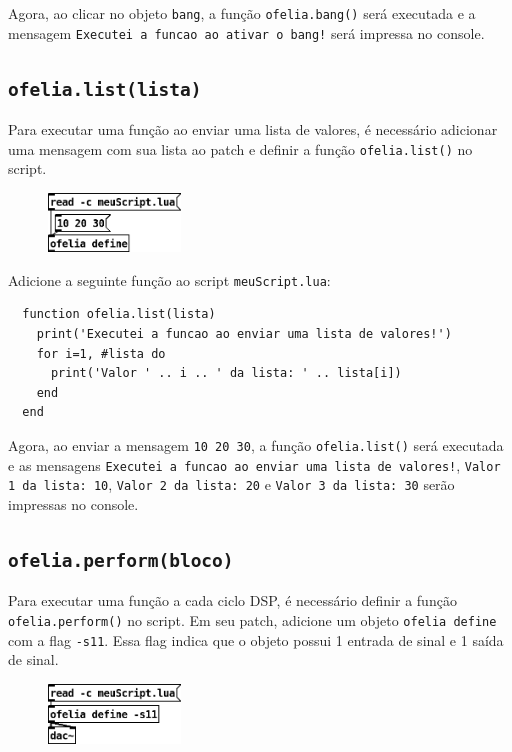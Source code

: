 \documentclass{article}
\begin{document}
Agora, ao clicar no objeto \texttt{bang}, a função \texttt{ofelia.bang()} será executada e a mensagem \texttt{Executei a funcao ao ativar o bang!} será impressa no console.

\subsection{\texttt{ofelia.list(lista)}}

Para executar uma função ao enviar uma lista de valores, é necessário adicionar uma mensagem com sua lista ao patch e definir a função \texttt{ofelia.list()} no script.

\begin{figure}[H]
  \centering
  \includegraphics[width=100pt]{list.png}
\end{figure}

Adicione a seguinte função ao script \texttt{meuScript.lua}:

\begin{center}
  \begin{lstlisting}
  function ofelia.list(lista)
    print('Executei a funcao ao enviar uma lista de valores!')
    for i=1, #lista do
      print('Valor ' .. i .. ' da lista: ' .. lista[i])
    end
  end
  \end{lstlisting}
\end{center}

Agora, ao enviar a mensagem \texttt{10 20 30}, a função \texttt{ofelia.list()} será executada e as mensagens \texttt{Executei a funcao ao enviar uma lista de valores!}, \texttt{Valor 1 da lista: 10}, \texttt{Valor 2 da lista: 20} e \texttt{Valor 3 da lista: 30} serão impressas no console.

\subsection{\texttt{ofelia.perform(bloco)}}

Para executar uma função a cada ciclo DSP, é necessário definir a função \texttt{ofelia.perform()} no script.
Em seu patch, adicione um objeto \texttt{ofelia define} com a flag \texttt{-s11}. Essa flag indica que o objeto possui 1 entrada de sinal e 1 saída de sinal.

\begin{figure}[H]
  \centering
  \includegraphics[width=100pt]{perform.png}
\end{figure}
\end{document}
